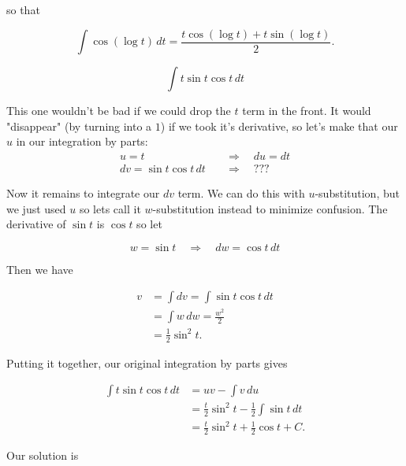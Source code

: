 \documentclass[12pt, letterpaper]{article}
\begin{document}
so that

\begin{equation*}
\boxed{
\int \cos{\left(\log{t}\right)} \, dt
  = \frac{t\cos{\left(\log{t}\right)} + t\sin{\left(\log{t}\right)}}{2}.
}
\end{equation*}

\newpage

$$ \int t\sin{t}\cos{t} \, dt $$

This one wouldn't be bad if we could drop the $t$ term in the front. It would "disappear" (by turning into a $1$) if we took it's derivative, so let's make that our $u$ in our integration by parts:
\begin{equation*}
\begin{aligned}
u = t \quad &\Rightarrow \quad du = dt \\
dv = \sin{t}\cos{t} \, dt \quad &\Rightarrow \quad ???
\end{aligned}
\end{equation*}

Now it remains to integrate our $dv$ term. We can do this with $u$-substitution, but we just used $u$ so lets call it $w$-substitution instead to minimize confusion. The derivative of $\sin{t}$ is $\cos{t}$ so let

$$ w = \sin{t} \quad \Rightarrow \quad dw = \cos{t} \, dt $$

Then we have

\begin{equation*}
\begin{aligned}
v &= \int dv = \int \sin{t}\cos{t} \, dt \\[0.2in]
  &= \int w \, dw = \frac{w^2}{2} \\[0.2in]
  &= \tfrac{1}{2} \sin^2{t}.
\end{aligned}
\end{equation*}

Putting it together, our original integration by parts gives

\begin{equation*}
\begin{aligned}
\int t\sin{t}\cos{t} \, dt
  &= uv - \int v \, du \\[0.2in]
  &= \frac{t}{2} \sin^2{t} - \frac{1}{2} \int \sin{t} \, dt \\[0.2in]
  &= \frac{t}{2} \sin^2{t} + \frac{1}{2} \cos{t} + C.
\end{aligned}
\end{equation*}

Our solution is
\end{document}
